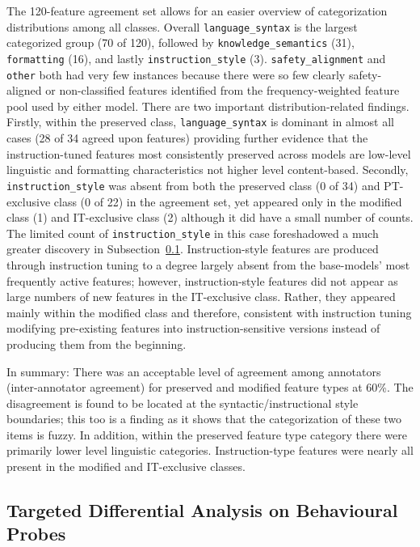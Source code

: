 The 120-feature agreement set allows for an easier overview of categorization distributions among all classes. Overall \texttt{language\_syntax} is the largest categorized group (70 of 120), followed by \texttt{knowledge\_semantics} (31), \texttt{formatting} (16), and lastly \texttt{instruction\_style} (3). \texttt{safety\_alignment} and \texttt{other} both had very few instances because there were so few clearly safety-aligned or non-classified features identified from the frequency-weighted feature pool used by either model. There are two important distribution-related findings. Firstly, within the preserved class, \texttt{language\_syntax} is dominant in almost all cases (28 of 34 agreed upon features) providing further evidence that the instruction-tuned features most consistently preserved across models are low-level linguistic and formatting characteristics not higher level content-based. Secondly, \texttt{instruction\_style} was absent from both the preserved class (0 of 34) and PT-exclusive class (0 of 22) in the agreement set, yet appeared only in the modified class (1) and IT-exclusive class (2) although it did have a small number of counts. The limited count of \texttt{instruction\_style} in this case foreshadowed a much greater discovery in Subsection~\ref{subsec:targeted-differential-analysis-results}. Instruction-style features are produced through instruction tuning to a degree largely absent from the base-models' most frequently active features; however, instruction-style features did not appear as large numbers of new features in the IT-exclusive class. Rather, they appeared mainly within the modified class and therefore, consistent with instruction tuning modifying pre-existing features into instruction-sensitive versions instead of producing them from the beginning.

In summary: There was an acceptable level of agreement among annotators (inter-annotator agreement) for preserved and modified feature types at 60\%. The disagreement is found to be located at the syntactic/instructional style boundaries; this too is a finding as it shows that the categorization of these two items is fuzzy. In addition, within the preserved feature type category there were primarily lower level linguistic categories. Instruction-type features were nearly all present in the modified and IT-exclusive classes.

\subsection{Targeted Differential Analysis on Behavioural Probes}
\label{subsec:targeted-differential-analysis-results}


